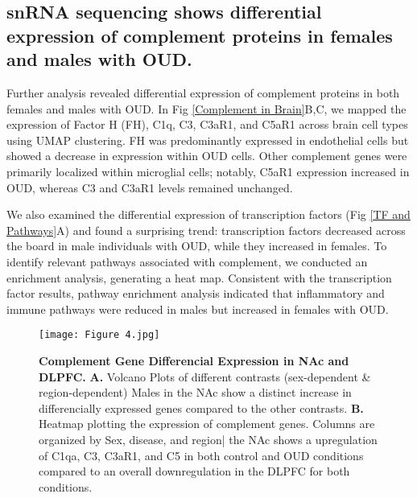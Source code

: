 \documentclass[10pt,letterpaper]{article}
\begin{document}
\subsection*{snRNA sequencing shows differential expression of complement proteins in females and males with OUD.}
    Further analysis revealed differential expression of complement proteins in both females and males with OUD. In Fig \ref{Complement in Brain}B,C, we mapped the expression of Factor H (FH), C1q, C3, C3aR1, and C5aR1 across brain cell types using UMAP clustering. FH was predominantly expressed in endothelial cells but showed a decrease in expression within OUD cells. Other complement genes were primarily localized within microglial cells; notably, C5aR1 expression increased in OUD, whereas C3 and C3aR1 levels remained unchanged.

    We also examined the differential expression of transcription factors (Fig \ref{TF and Pathways}A) and found a surprising trend: transcription factors decreased across the board in male individuals with OUD, while they increased in females. To identify relevant pathways associated with complement, we conducted an enrichment analysis, generating a heat map. Consistent with the transcription factor results, pathway enrichment analysis indicated that inflammatory and immune pathways were reduced in males but increased in females with OUD.

\begin{figure}[ht] %
\texttt{[image: Figure 4.jpg]}
\caption{\color{Gray} \textbf{Complement Gene Differencial Expression in NAc and DLPFC. } 
\textbf{A.} Volcano Plots of different contrasts (sex-dependent \& region-dependent) Males in the NAc show a distinct increase in differencially expressed genes compared to the other contrasts. \textbf{B.} Heatmap plotting the expression of complement genes. Columns are organized by Sex, disease, and region| the NAc shows a upregulation of C1qa, C3, C3aR1, and C5 in both control and OUD conditions compared to an overall downregulation in the DLPFC for both conditions.
}
\label{VolcanoHeat} %
\end{figure}
\end{document}

